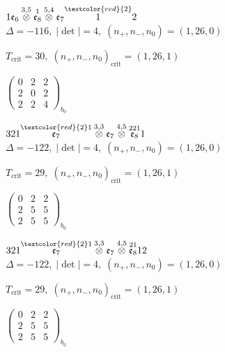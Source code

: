 \documentclass[10pt]{article}
\begin{document}
\smallskip

$1\mathfrak{e}_6\overset{3,5}{\otimes}\overset{1}{\mathfrak{e}_8}\overset{5,4}{\otimes}\mathfrak{e}_7\overset{\textcolor{red}{2}}{1}2$ \quad $\Delta=-116,\; |\det|=4,\; (n_+,n_-,n_0)=(1,26,0)$

\hspace{1em}$T_{\text{crit}}=30,\; (n_+,n_-,n_0)_{\text{crit}}=(1,26,1)$

\hspace{2em}$\left(\begin{smallmatrix}0 & 2 & 2 \\ 2 & 0 & 2 \\ 2 & 2 & 4\end{smallmatrix}\right)_{\!b_0}$

\smallskip

$321\overset{\textcolor{red}{2}1}{\mathfrak{e}_7}\overset{3,3}{\otimes}\mathfrak{e}_7\overset{4,5}{\otimes}\overset{221}{\mathfrak{e}_8}1$ \quad $\Delta=-122,\; |\det|=4,\; (n_+,n_-,n_0)=(1,26,0)$

\hspace{1em}$T_{\text{crit}}=29,\; (n_+,n_-,n_0)_{\text{crit}}=(1,26,1)$

\hspace{2em}$\left(\begin{smallmatrix}0 & 2 & 2 \\ 2 & 5 & 5 \\ 2 & 5 & 5\end{smallmatrix}\right)_{\!b_0}$

\smallskip

$321\overset{\textcolor{red}{2}1}{\mathfrak{e}_7}\overset{3,3}{\otimes}\mathfrak{e}_7\overset{4,5}{\otimes}\overset{21}{\mathfrak{e}_8}12$ \quad $\Delta=-122,\; |\det|=4,\; (n_+,n_-,n_0)=(1,26,0)$

\hspace{1em}$T_{\text{crit}}=29,\; (n_+,n_-,n_0)_{\text{crit}}=(1,26,1)$

\hspace{2em}$\left(\begin{smallmatrix}0 & 2 & 2 \\ 2 & 5 & 5 \\ 2 & 5 & 5\end{smallmatrix}\right)_{\!b_0}$
\end{document}
